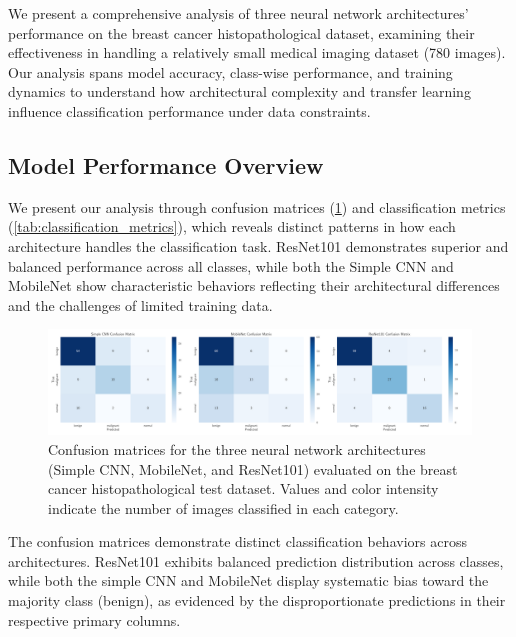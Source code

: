 
We present a comprehensive analysis of three neural network architectures' performance on the breast cancer histopathological dataset, examining their effectiveness in handling a relatively small medical imaging dataset (780 images). Our analysis spans model accuracy, class-wise performance, and training dynamics to understand how architectural complexity and transfer learning influence classification performance under data constraints.

\subsection{Model Performance Overview}

We present our analysis through confusion matrices (\cref{fig:confusion_matrix}) and classification metrics (\cref{tab:classification_metrics}), which reveals distinct patterns in how each architecture handles the classification task. ResNet101 demonstrates superior and balanced performance across all classes, while both the Simple CNN and MobileNet show characteristic behaviors reflecting their architectural differences and the challenges of limited training data.

\onecolumngrid
\begin{figure}[h!]
    \begin{minipage}{\textwidth}
        \centering
        \includegraphics[width = \textwidth]{../figs/confusion_matrices.pdf}
        \caption{Confusion matrices for the three neural network architectures (Simple CNN, MobileNet, and ResNet101) evaluated on the breast cancer histopathological test dataset. Values and color intensity indicate the number of images classified in each category.}
        \label{fig:confusion_matrix}
    \end{minipage}
\end{figure}
\twocolumngrid

The confusion matrices demonstrate distinct classification behaviors across architectures. ResNet101 exhibits balanced prediction distribution across classes, while both the simple CNN and MobileNet display systematic bias toward the majority class (benign), as evidenced by the disproportionate predictions in their respective primary columns.


